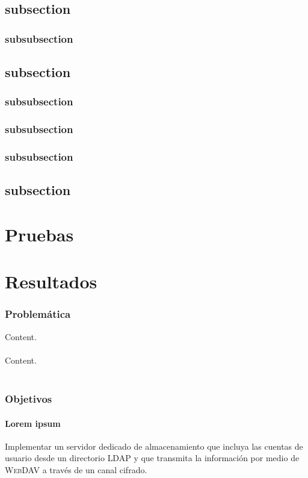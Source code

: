 \documentclass{beamer}
\begin{document}
  \subsection{subsection}
    \subsubsection{subsubsection}
  \subsection{subsection}
    \subsubsection{subsubsection}
    \subsubsection{subsubsection}
    \subsubsection{subsubsection}
  \subsection{subsection}

\section{Pruebas}
\section{Resultados}

\begin{frame}
\frametitle{Problem\'{a}tica}

Content.\\~\\

Content.\\~\\



\end{frame}
\begin{frame}

\frametitle{Objetivos}

\framesubtitle{Lorem ipsum}

Implementar un servidor dedicado de almacenamiento que incluya las cuentas de usuario desde un directorio \textsc{LDAP} y que transmita la informaci\'{o}n por medio de \textsc{WebDAV} a trav\'{e}s de un canal cifrado.



\end{frame}
\end{document}
